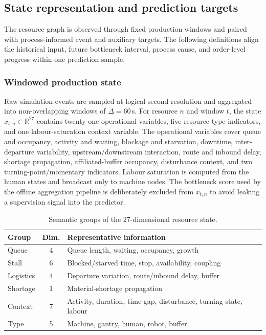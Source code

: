 \documentclass[a4paper,fleqn]{cas-dc}
\begin{document}
\subsection{State representation and prediction targets}

The resource graph is observed through fixed production windows and paired with process-informed event and auxiliary targets. The following definitions align the historical input, future bottleneck interval, process cause, and order-level progress within one prediction sample.


\subsubsection{Windowed production state}

Raw simulation events are sampled at logical-second resolution and aggregated into non-overlapping windows of $\Delta=60$\,s. For resource $n$ and window $t$, the state $x_{t,n}\in\mathbb{R}^{27}$ contains twenty-one operational variables, five resource-type indicators, and one labour-saturation context variable. The operational variables cover queue and occupancy, activity and waiting, blockage and starvation, downtime, inter-departure variability, upstream/downstream interaction, route and inbound delay, shortage propagation, affiliated-buffer occupancy, disturbance context, and two turning-point/momentary indicators. Labour saturation is computed from the human states and broadcast only to machine nodes. The bottleneck score used by the offline aggregation pipeline is deliberately excluded from $x_{t,n}$ to avoid leaking a supervision signal into the predictor.


\begin{table}[t]
\centering
\caption{Semantic groups of the 27-dimensional resource state.}
\label{tab:feature-groups}
\scriptsize
\setlength{\tabcolsep}{3pt}
\renewcommand{\arraystretch}{1.12}
\begin{tabularx}{\columnwidth}{@{}l c >{\raggedright\arraybackslash}X@{}}
\toprule
Group & Dim. & Representative information \\
\midrule
Queue & 4 & Queue length, waiting, occupancy, growth \\
Stall & 6 & Blocked/starved time, stop, availability, coupling \\
Logistics & 4 & Departure variation, route/inbound delay, buffer \\
Shortage & 1 & Material-shortage propagation \\
Context & 7 & Activity, duration, time gap, disturbance, turning state, labour \\
Type & 5 & Machine, gantry, human, robot, buffer \\
\bottomrule
\end{tabularx}
\end{table}
\end{document}
